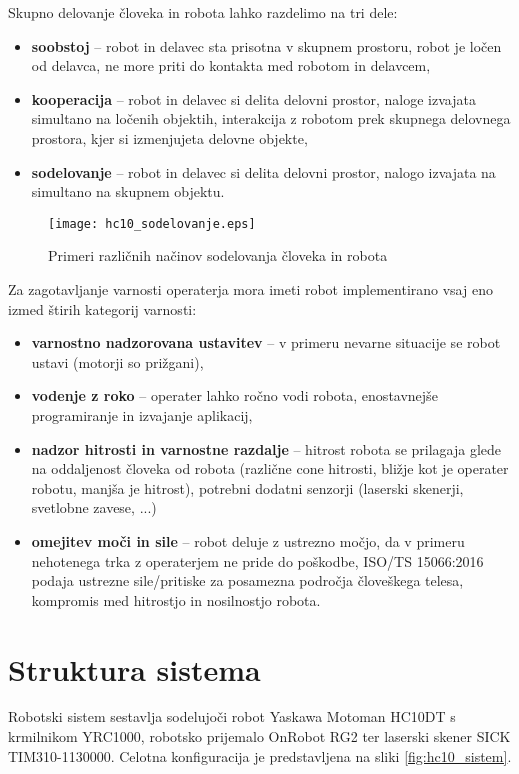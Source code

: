 Skupno delovanje človeka in robota lahko razdelimo na tri dele:
\begin{itemize}
	\item \textbf{soobstoj} -- robot in delavec sta prisotna v skupnem prostoru, robot je ločen od delavca, ne more priti do kontakta med robotom in delavcem,
	\item \textbf{kooperacija} -- robot in delavec si delita delovni prostor, naloge izvajata simultano na ločenih objektih, interakcija z robotom prek skupnega delovnega prostora, kjer si izmenjujeta delovne objekte,
	\item  \textbf{sodelovanje} -- robot in delavec si delita delovni prostor, nalogo izvajata na simultano na skupnem objektu.
\end{itemize}


\begin{figure}[!hbt]
	\centering
	\texttt{[image: hc10\_sodelovanje.eps]}
	\caption{Primeri različnih načinov sodelovanja človeka in robota}
	\label{fig:hc10_sodel}
\end{figure}


Za zagotavljanje varnosti operaterja mora imeti robot implementirano vsaj eno izmed štirih kategorij varnosti:
\begin{itemize}
	\item \textbf{varnostno nadzorovana ustavitev} -- v primeru nevarne situacije se robot ustavi (motorji so prižgani),
	\item \textbf{vodenje z roko}  -- operater lahko ročno vodi robota, enostavnejše programiranje in izvajanje aplikacij,
	\item \textbf{nadzor hitrosti in varnostne razdalje} -- hitrost robota se prilagaja glede na oddaljenost človeka od robota (različne cone hitrosti, bližje kot je operater robotu, manjša je hitrost), potrebni dodatni senzorji (laserski skenerji, svetlobne zavese, ...)
	\item \textbf{omejitev moči in sile} -- robot deluje z ustrezno močjo, da v primeru nehotenega trka z operaterjem ne pride do poškodbe, ISO/TS 15066:2016 podaja ustrezne sile/pritiske za posamezna področja človeškega telesa, kompromis med hitrostjo in nosilnostjo robota.
\end{itemize}


\section{Struktura sistema}

Robotski sistem sestavlja sodelujoči robot Yaskawa Motoman HC10DT s krmilnikom YRC1000, robotsko prijemalo OnRobot RG2 ter laserski skener SICK TIM310-1130000. Celotna konfiguracija je predstavljena na sliki \ref{fig:hc10_sistem}.

